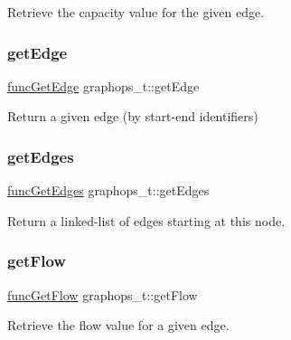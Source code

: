 Retrieve the capacity value for the given edge. 

\mbox{\label{structgraphops__t_aafbe3ec7bdce040b86d7748c953cf607}} 
\subsubsection{\texorpdfstring{get\+Edge}{getEdge}}
{\footnotesize\ttfamily \hyperlink{graphops_8h_a65a97104978aff138ce01db4b7baa237}{func\+Get\+Edge} graphops\+\_\+t\+::get\+Edge}



Return a given edge (by start-\/end identifiers) 

\mbox{\label{structgraphops__t_a87fec7e1150c05e54e34ab09fe401eaa}} 
\subsubsection{\texorpdfstring{get\+Edges}{getEdges}}
{\footnotesize\ttfamily \hyperlink{graphops_8h_a1cf1c55a55049fff31b8097bfd289a62}{func\+Get\+Edges} graphops\+\_\+t\+::get\+Edges}



Return a linked-\/list of edges starting at this node. 

\mbox{\label{structgraphops__t_adda43f12be5d13e127c0fa79454dd92f}} 
\subsubsection{\texorpdfstring{get\+Flow}{getFlow}}
{\footnotesize\ttfamily \hyperlink{graphops_8h_a9294a965d66cd4a4d39e0b388edeff1d}{func\+Get\+Flow} graphops\+\_\+t\+::get\+Flow}



Retrieve the flow value for a given edge. 

\mbox{\label{structgraphops__t_ac6c5bec2f102e4da5959cc3db66ac3c6}} 
